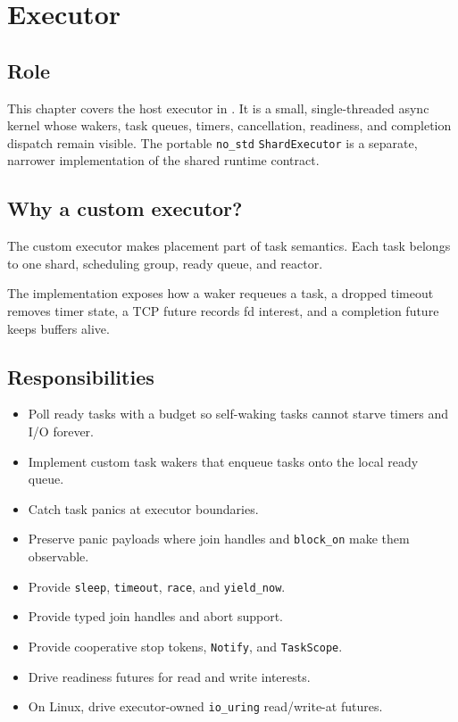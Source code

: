 \chapter{Executor}
\label{chap:executor}

\section{Role}

This chapter covers the host executor in
. It is a small, single-threaded async
kernel whose wakers, task queues, timers, cancellation, readiness, and
completion dispatch remain visible. The portable \texttt{no\_std}
\texttt{ShardExecutor} is a separate, narrower implementation of the shared
runtime contract.

\section{Why a custom executor?}

The custom executor makes placement part of task semantics. Each task belongs
to one shard, scheduling group, ready queue, and reactor.

The implementation exposes how a waker requeues a task, a dropped timeout
removes timer state, a TCP future records fd interest, and a completion future
keeps buffers alive.

\section{Responsibilities}

\begin{itemize}
    \item Poll ready tasks with a budget so self-waking tasks cannot starve
          timers and I/O forever.
    \item Implement custom task wakers that enqueue tasks onto the local ready
          queue.
    \item Catch task panics at executor boundaries.
    \item Preserve panic payloads where join handles and \texttt{block\_on}
          make them observable.
    \item Provide \texttt{sleep}, \texttt{timeout}, \texttt{race}, and
          \texttt{yield\_now}.
    \item Provide typed join handles and abort support.
    \item Provide cooperative stop tokens, \texttt{Notify}, and
          \texttt{TaskScope}.
    \item Drive readiness futures for read and write interests.
    \item On Linux, drive executor-owned \texttt{io\_uring} read/write-at
          futures.
\end{itemize}

